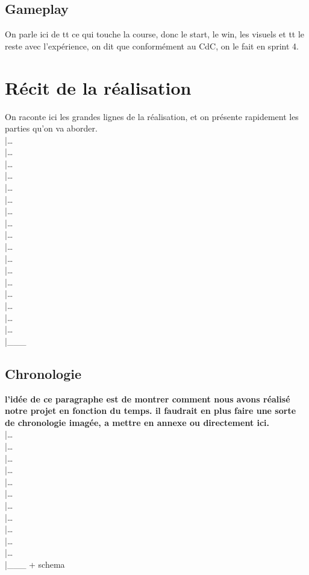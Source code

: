 \documentclass[12pt,a4paper]{article}
\begin{document}
        \subsection{Gameplay}
            On parle ici de tt ce qui touche la course, donc le start, le win, les visuels et tt
            le reste avec l'expérience, on dit que conformément au CdC, on le fait en sprint 4.


    \clearpage
    \section{Récit de la réalisation}
        On raconte ici les grandes lignes de la réalisation, et on présente rapidement les parties
        qu'on va aborder.\\
        |\dots\\|\dots\\|\dots\\|\dots\\|\dots\\|\dots\\|\dots\\|\dots\\|\dots\\
        |\dots\\|\dots\\|\dots\\|\dots\\|\dots\\|\dots\\|\dots\\|\dots\\|\_\_\_\\


        \subsection{Chronologie}
            \textbf{l'idée de ce paragraphe est de montrer comment nous avons réalisé notre projet en 
            fonction du temps. il faudrait en plus faire une sorte de chronologie imagée, a mettre en 
            annexe ou directement ici.}\\
            |\dots\\|\dots\\|\dots\\|\dots\\|\dots\\|\dots\\|\dots\\|\dots\\|\dots\\|\dots\\|\dots\\
            |\_\_\_ + schema
\end{document}
